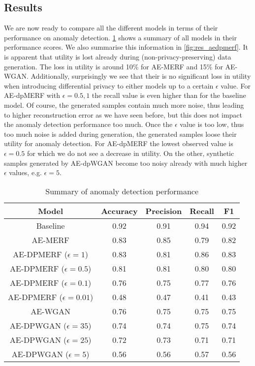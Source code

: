 \subsection{Results}
We are now ready to compare all the different models in terms of their performance on anomaly detection. \cref{tab:results} shows a summary of all models in their performance scores. We also summarise this information in \cref{fig:res_aedpmerf}. It is apparent that utility is lost already during (non-privacy-preserving) data generation. The loss in utility is around 10\% for AE-MERF and 15\% for AE-WGAN. Additionally, surprisingly we see that their is no significant loss in utility when introducing differential privacy to either models up to a certain $\epsilon$ value. For AE-dpMERF with $\epsilon=0.5, 1$ the recall value is even higher than for the baseline model. Of course, the generated samples contain much more noise, thus leading to higher reconstruction error as we have seen before, but this does not impact the anomaly detection performance too much. Once the $\epsilon$ value is too low, thus too much noise is added during generation, the generated samples loose their utility for anomaly detection. For AE-dpMERF the lowest observed value is $\epsilon=0.5$ for which we do not see a decrease in utility. On the other, synthetic samples generated by AE-dpWGAN become too noisy already with much higher $\epsilon$ values, e.g. $\epsilon=5$. 
\begin{table}[h]
    \centering
    \begin{tabular}{c||c|c|c|c}
        \textbf{Model} & \textbf{Accuracy} & \textbf{Precision} & \textbf{Recall} & \textbf{F1} \\ 
        \hline 
        \hline

        Baseline & 0.92 & 0.91 & 0.94 & 0.92 \vspace{0.5cm}\\
        \hline

        AE-MERF & 0.83 & 0.85 & 0.79 & 0.82 \\
        \hline
        AE-DPMERF ($\epsilon=1$) & 0.83 & 0.81 & 0.86 & 0.83 \\
        \hline
        AE-DPMERF ($\epsilon=0.5$) & 0.81 & 0.81 & 0.80 & 0.80 \\
        \hline
        AE-DPMERF ($\epsilon=0.1$) & 0.76 & 0.75 & 0.77 & 0.76\\
        \hline
        AE-DPMERF ($\epsilon=0.01$) & 0.48 & 0.47 & 0.41 & 0.43 \vspace{0.5cm}\\
        \hline

        AE-WGAN & 0.76 & 0.75 & 0.75 & 0.75 \\
        \hline
        AE-DPWGAN ($\epsilon=35$) & 0.74 & 0.74 & 0.75 & 0.74 \\
        \hline
        AE-DPWGAN ($\epsilon=25$) & 0.72 & 0.73 & 0.71 & 0.71 \\
        \hline
        AE-DPWGAN ($\epsilon=5$) & 0.56 & 0.56 & 0.57 & 0.56\\

    \end{tabular}
    \caption{Summary of anomaly detection performance}
    \label{tab:results}
\end{table}

